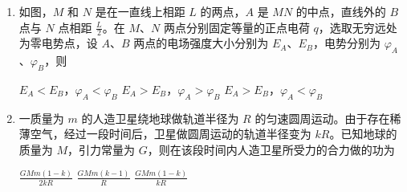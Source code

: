\documentclass[\gkver]{gaokaozhenti}
\begin{document}
\begin{enumerate}
{故选 A。
}

\item
如图，$M$ 和 $N$ 是在一直线上相距 $L$ 的两点，$A$ 是 $MN$ 的中点，直线外的 $B$ 点与 $N$ 点相距 $\frac{L}{2}$。在 $M$、$N$ 两点分别固定等量的正点电荷 $q$，选取无穷远处为零电势点，设 $A$、$B$ 两点的电场强度大小分别为 $E_{A}$、$E_{B}$，电势分别为 $\varphi_{A}$、$\varphi_{B}$，则


{$E_{A} < E_{B}$，$\varphi_{A} < \varphi_{B}$}
{$E_{A} > E_{B}$，$\varphi_{A} > \varphi_{B}$}
{$E_{A} > E_{B}$，$\varphi_{A} < \varphi_{B}$}


\item
一质量为 $m$ 的人造卫星绕地球做轨道半径为 $R$ 的匀速圆周运动。由于存在稀薄空气，经过一段时间后，卫星做圆周运动的轨道半径变为 $kR$。已知地球的质量为 $M$，引力常量为 $G$，则在该段时间内人造卫星所受力的合力做的功为

{$\frac{GMm(1 - k)}{2kR}$}
{$\frac{GMm(k - 1)}{R}$}
{$\frac{GMm(1 - k)}{kR}$}

\end{enumerate}
\end{document}
